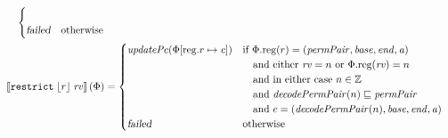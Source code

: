 \documentclass[a4paper]{article}
\newcommand{\update}[2]{[#1 \mapsto #2]}
\newcommand{\sem}[1]{\left\llbracket #1 \right\rrbracket}
\newcommand{\var}[1]{\mathit{#1}}
\newcommand{\rv}{\var{rv}}
\newcommand{\gl}{\var{g}}
\newcommand{\addr}{\var{a}}
\newcommand{\start}{\var{base}}
\newcommand{\addrend}{\var{end}}
\newcommand{\perm}{\var{perm}}
\newcommand{\permp}{\var{permPair}}
\newcommand{\stdcap}[1][(\perm,\gl)]{\left(#1,\start,\addrend,\addr \right)}
\newcommand{\plainproj}[1]{\mathrm{#1}}
\newcommand{\memreg}[1][\Phi]{#1.\plainproj{reg}}
\newcommand{\updateReg}[3][\Phi]{#1\update{\plainproj{reg}.#2}{#3}}
\newcommand{\failed}{\textsl{failed}}
\newcommand{\plainfun}[2]{
  \ifthenelse{\equal{#2}{}}
  {\mathit{#1}}
  {\mathit{#1}(#2)}
}
\newcommand{\decodePermPair}{\plainfun{decodePermPair}}
\newcommand{\stdUpdatePc}[1]{\plainfun{updatePc}{#1}}
\newcommand{\ints}{\mathbb{Z}}
\newcommand{\refreg}[1]{\lfloor #1 \rfloor}
\newcommand{\zinstr}[1]{\mathtt{#1}}
\newcommand{\twoinstr}[3]{\zinstr{#1} \; #2 \; #3}
\newcommand{\restricttwo}[2]{\twoinstr{restrict}{#1}{#2}}
\begin{document}
\begin{align*}
\begin{cases}
\begin{array}[t]{l}
                                               \end{array}\\
                                               \failed               & \text{otherwise}
                                             \end{cases} 
  \\
  \sem{\restricttwo{\refreg{r}}{\rv}}(\Phi)           & =
                                                  \begin{cases}
                                                    \stdUpdatePc{\updateReg{r}{\var{c}}}  &
                                                    \arraycolsep=0pt
                                                    \begin{array}[t]{l}
                                                      \text{if $\memreg(r) = \stdcap[\permp]$}\\
                                                      \quad\text{and either $\rv = n$ or $\memreg(\rv) = n$}\\
                                                      \quad\text{and in either case $n \in \ints$}\\
                                                      \quad\text{and $\decodePermPair{n}\sqsubseteq \permp$}\\ 
                                                      \quad\text{and $c = (\decodePermPair{n},\start,\addrend,\addr)$}
                                                    \end{array}\\
                                                    \failed                   & \text{otherwise}
                                                  \end{cases} 
\end{align*}
\end{document}
